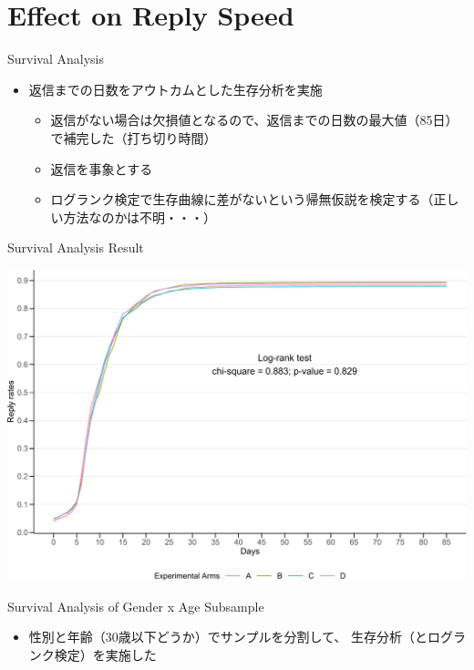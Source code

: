 \documentclass[
      aspectratio=169,
        12pt,
    ]{beamer}
\providecommand{\tightlist}{%
  \setlength{\itemsep}{0pt}\setlength{\parskip}{0pt}}
\begin{document}
\hypertarget{effect-on-reply-speed}{%
\section{Effect on Reply Speed}\label{effect-on-reply-speed}}

\begin{frame}{Survival Analysis}
\protect\hypertarget{survival-analysis}{}
\begin{itemize}
\tightlist
\item
  返信までの日数をアウトカムとした生存分析を実施

  \begin{itemize}
  \tightlist
  \item
    返信がない場合は欠損値となるので、返信までの日数の最大値（85日）で補完した（打ち切り時間）
  \item
    返信を事象とする
  \item
    ログランク検定で生存曲線に差がないという帰無仮説を検定する（正しい方法なのかは不明・・・）
  \end{itemize}
\end{itemize}
\end{frame}

\begin{frame}{Survival Analysis Result}
\protect\hypertarget{survival-analysis-result}{}
\begin{center}\includegraphics[width=0.75\linewidth]{report_files/figure-beamer/plot-surv-1} \end{center}
\end{frame}

\begin{frame}{Survival Analysis of Gender x Age Subsample}
\protect\hypertarget{survival-analysis-of-gender-x-age-subsample}{}
\begin{itemize}
\tightlist
\item
  性別と年齢（30歳以下どうか）でサンプルを分割して、
  生存分析（とログランク検定）を実施した
\end{itemize}
\end{frame}
\end{document}
